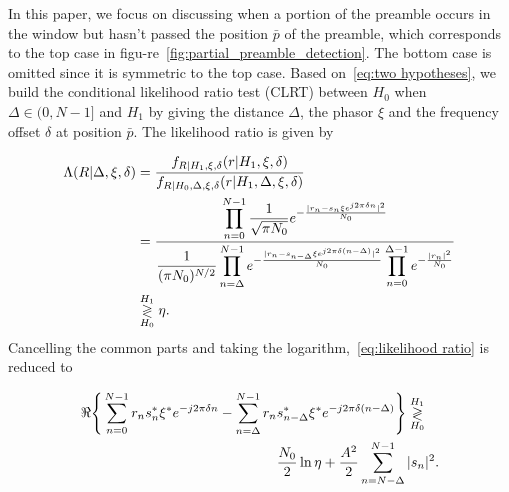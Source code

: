 
In this paper, we focus on discussing when a portion of the preamble 
occurs in the window but hasn't passed the position $\bar{p}$
of the preamble, which corresponds to the top case in figu-re~\ref{fig:partial_preamble_detection}.
The bottom case is omitted since it is symmetric to the top case.
Based on~\eqref{eq:two hypotheses}, we build the conditional likelihood ratio test (CLRT)
between $H_0$ when $\Delta \in(0,N-1]$ and $H_1$ by giving the distance $\Delta$, the phasor $\xi$ and
the frequency offset $\delta$ at position $\bar{p}$. The likelihood ratio is given by

\begin{equation}
    \label{eq:likelihood ratio}
    \begin{aligned}
    \Lambda(R|\Delta,\xi,\delta)&=\frac{f_{R|H_1,\xi,\delta}(r|H_1,\xi,\delta)}{f_{R|H_0,\Delta,\xi,\delta}(r|H_1,\Delta,\xi,\delta)} \\
    &=\frac{\displaystyle \prod_{n=0}^{N-1}\frac{1}{\sqrt{\pi N_0}}e^{-\frac{|r_n-s_n\xi e^{j2\pi\delta n}|^2}{N_0}}}{\displaystyle \frac{1}{(\pi N_0)^{N/2}}\prod_{n=\Delta}^{N-1}e^{-\frac{|r_n-s_{n-\Delta}\xi e^{j2\pi\delta (n-\Delta)}|^2}{N_0}}\prod_{n=0}^{\Delta-1}e^{-\frac{|r_n|^2}{N_0}}} \\
    & \mathrel{\mathop\gtrless\limits^{H_1}_{H_0}} \eta.
    \end{aligned}
  \end{equation}
Cancelling the common parts and taking the logarithm,~\eqref{eq:likelihood ratio} is reduced to

\begin{equation}
    \label{eq:log likelihood}
    \begin{aligned}
    \Re\Bigg\{\sum_{n=0}^{N-1}r_ns_n^*\xi^*e^{-j2\pi\delta n}-\sum_{n=\Delta}^{N-1}r_n&s_{n-\Delta}^*\xi^*e^{-j2\pi\delta(n-\Delta)}\Bigg\} \mathrel{\mathop\gtrless\limits^{H_1}_{H_0}} \\
    &\frac{N_0}{2}\ln\eta+\frac{A^2}{2}\sum_{n=N-\Delta}^{N-1}|s_n|^2.
    \end{aligned}
\end{equation}


